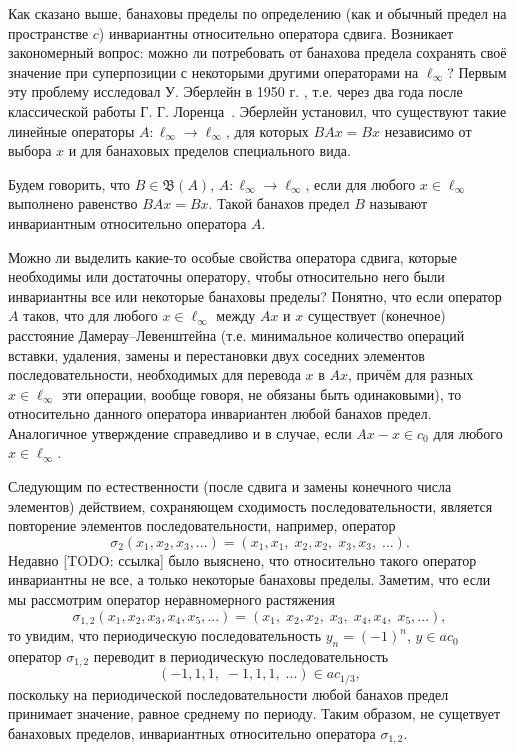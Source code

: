 Как сказано выше, банаховы пределы по определению (как и обычный предел на пространстве $c$) инвариантны относительно оператора сдвига.
Возникает закономерный вопрос: можно ли потребовать от банахова предела сохранять своё значение
при суперпозиции с некоторыми другими операторами на $\ell_\infty$?
Первым эту проблему исследовал У. Эберлейн в 1950 г. \cite{Eberlein},
т.е. через два года после классической работы Г. Г. Лоренца~\cite{lorentz1948contribution}.
Эберлейн установил, что существуют такие линейные операторы  $A : \ell_\infty\to \ell_\infty$,
для которых $BAx = Bx$ независимо от выбора $x$ и для банаховых пределов специального вида.

Будем говорить, что $B\in\mathfrak B(A)$, $A : \ell_\infty\to \ell_\infty$, если для любого $x\in \ell_\infty$
выполнено равенство $BAx = Bx$.
Такой банахов предел $B$ называют инвариантным относительно оператора $A$.

Можно ли выделить какие-то особые свойства оператора сдвига,
которые необходимы или достаточны оператору, чтобы относительно него были инвариантны все или некоторые банаховы пределы?
Понятно, что если оператор $A$ таков, что для любого $x\in\ell_\infty$ между $Ax$ и $x$
существует (конечное) расстояние Дамерау--Левенштейна \cite{damerau1964technique} (т.е. минимальное количество операций вставки, удаления, замены и перестановки двух соседних элементов последовательности, необходимых для перевода $x$ в $Ax$, причём для разных $x\in\ell_\infty$ эти операции, вообще говоря, не обязаны быть одинаковыми), то относительно данного оператора инвариантен любой банахов предел. Аналогичное утверждение справедливо и в случае, если $Ax -x \in c_0$ для любого $x\in \ell_\infty$.

Следующим по естественности (после сдвига и замены конечного числа элементов) действием, сохраняющем сходимость последовательности, является повторение элементов последовательности, например, оператор
\begin{equation}
	\sigma_2(x_1,x_2,x_3,...) = (x_1,x_1, \; x_2, x_2, \; x_3, x_3, \; ...)
	.
\end{equation}
Недавно [TODO: ссылка] было выяснено, что относительно такого оператор инвариантны не все, а только некоторые банаховы пределы.
Заметим, что если мы рассмотрим оператор неравномерного растяжения
\begin{equation}
	\sigma_{1,2}(x_1,x_2,x_3,x_4,x_5,...) = (x_1, \; x_2, x_2, \;  x_3, \; x_4, x_4, \; x_5, ...)
	,
\end{equation}
то увидим, что периодическую последовательность $y_n = (-1)^n$, $y\in ac_0$ оператор $\sigma_{1,2}$
переводит в периодическую последовательность
\begin{equation}
	(-1, 1, 1, \; -1, 1, 1, \; ...) \in ac_{1/3}
	,
\end{equation}
поскольку на периодической последовательности любой банахов предел принимает значение, равное среднему по периоду.
Таким образом, не сущетвует банаховых пределов, инвариантных относительно оператора $\sigma_{1,2}$.


